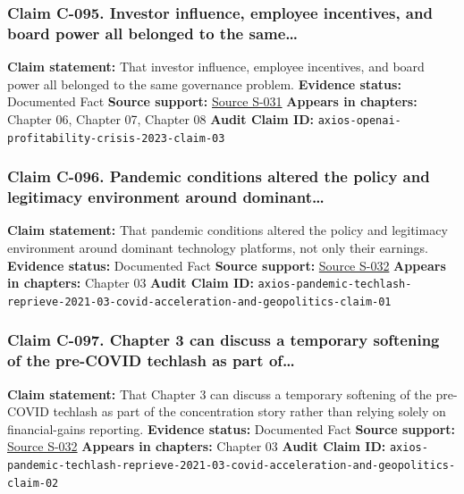 \documentclass[
  american,
  11pt,
  letterpaper,
]{article}
\begin{document}
\subsubsection{Claim C-095. Investor influence, employee incentives, and
board power all belonged to the
same\ldots{}}\label{claim-c-095-investor-influence-employee-incentives-and-board-power-all-belonged-to-the-same}

\textbf{Claim statement:} That investor influence, employee incentives,
and board power all belonged to the same governance problem.
\textbf{Evidence status:} Documented Fact \textbf{Source support:}
\hyperref[source-s-031-how-tensions-over-profitability-at-openai-turned-into-a-full-blown-crisis]{Source
S-031} \textbf{Appears in chapters:} Chapter 06, Chapter 07, Chapter 08
\textbf{Audit Claim ID:}
\texttt{axios-openai-profitability-crisis-2023-claim-03}

\subsubsection{Claim C-096. Pandemic conditions altered the policy and
legitimacy environment around
dominant\ldots{}}\label{claim-c-096-pandemic-conditions-altered-the-policy-and-legitimacy-environment-around-dominant}

\textbf{Claim statement:} That pandemic conditions altered the policy
and legitimacy environment around dominant technology platforms, not
only their earnings. \textbf{Evidence status:} Documented Fact
\textbf{Source support:}
\hyperref[source-s-032-pandemic-provides-a-techlash-reprieve]{Source
S-032} \textbf{Appears in chapters:} Chapter 03 \textbf{Audit Claim ID:}
\texttt{axios-pandemic-techlash-reprieve-2021-03-covid-acceleration-and-geopolitics-claim-01}

\subsubsection{Claim C-097. Chapter 3 can discuss a temporary softening
of the pre-COVID techlash as part
of\ldots{}}\label{claim-c-097-chapter-3-can-discuss-a-temporary-softening-of-the-pre-covid-techlash-as-part-of}

\textbf{Claim statement:} That Chapter 3 can discuss a temporary
softening of the pre-COVID techlash as part of the concentration story
rather than relying solely on financial-gains reporting.
\textbf{Evidence status:} Documented Fact \textbf{Source support:}
\hyperref[source-s-032-pandemic-provides-a-techlash-reprieve]{Source
S-032} \textbf{Appears in chapters:} Chapter 03 \textbf{Audit Claim ID:}
\texttt{axios-pandemic-techlash-reprieve-2021-03-covid-acceleration-and-geopolitics-claim-02}
\end{document}

